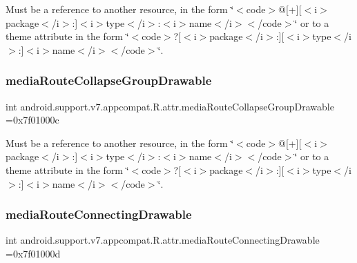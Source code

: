 Must be a reference to another resource, in the form \char`\"{}$<$code$>$@\mbox{[}+\mbox{]}\mbox{[}$<$i$>$package$<$/i$>$\+:\mbox{]}$<$i$>$type$<$/i$>$\+:$<$i$>$name$<$/i$>$$<$/code$>$\char`\"{} or to a theme attribute in the form \char`\"{}$<$code$>$?\mbox{[}$<$i$>$package$<$/i$>$\+:\mbox{]}\mbox{[}$<$i$>$type$<$/i$>$\+:\mbox{]}$<$i$>$name$<$/i$>$$<$/code$>$\char`\"{}. \mbox{\label{classandroid_1_1support_1_1v7_1_1appcompat_1_1R_1_1attr_adae1b120a8cba2dfa6f1416ccc049b02}} 
\subsubsection{\texorpdfstring{media\+Route\+Collapse\+Group\+Drawable}{mediaRouteCollapseGroupDrawable}}
{\footnotesize\ttfamily int android.\+support.\+v7.\+appcompat.\+R.\+attr.\+media\+Route\+Collapse\+Group\+Drawable =0x7f01000c\hspace{0.3cm}{\ttfamily [static]}}

Must be a reference to another resource, in the form \char`\"{}$<$code$>$@\mbox{[}+\mbox{]}\mbox{[}$<$i$>$package$<$/i$>$\+:\mbox{]}$<$i$>$type$<$/i$>$\+:$<$i$>$name$<$/i$>$$<$/code$>$\char`\"{} or to a theme attribute in the form \char`\"{}$<$code$>$?\mbox{[}$<$i$>$package$<$/i$>$\+:\mbox{]}\mbox{[}$<$i$>$type$<$/i$>$\+:\mbox{]}$<$i$>$name$<$/i$>$$<$/code$>$\char`\"{}. \mbox{\label{classandroid_1_1support_1_1v7_1_1appcompat_1_1R_1_1attr_a689f21defa5306972fa19e82bd3397d1}} 
\subsubsection{\texorpdfstring{media\+Route\+Connecting\+Drawable}{mediaRouteConnectingDrawable}}
{\footnotesize\ttfamily int android.\+support.\+v7.\+appcompat.\+R.\+attr.\+media\+Route\+Connecting\+Drawable =0x7f01000d\hspace{0.3cm}{\ttfamily [static]}}

